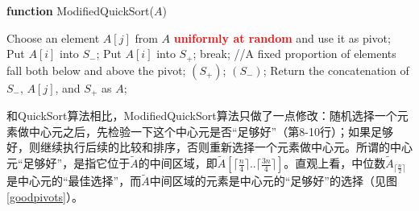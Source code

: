 \begin{algorithm}[H]
\caption{{\sc ModifiedQuickSort} algorithm}\label{ModifiedQuickSortAlgo} 
{\bf function} {\sc ModifiedQuickSort}($A$) 
\begin{algorithmic}[1]
	\STATE Choose an element $A[j]$ from $A$ \textcolor{red}{\bf uniformly at random} and use it as pivot;
			\STATE Put $A[i]$ into $S_{-}$;
		\ELSE 
			\STATE Put $A[i]$ into $S_{+}$; 
		\ENDIF
	\ENDFOR	
		\STATE break; //A fixed proportion of elements fall both below and above the pivot; 
	\ENDIF
\ENDWHILE
{}$(S_{+})$;
$(S_{-})$;
\STATE Return the concatenation of $S_{-}$, $A[j]$, and $S_{+}$ as $A$; 
\end{algorithmic}
\end{algorithm}

和{\sc QuickSort}算法相比，{\sc ModifiedQuickSort}算法只做了一点修改：随机选择一个元素做中心元之后，先检验一下这个中心元是否“足够好”（第8-10行）；如果足够好，则继续执行后续的比较和排序，否则重新选择一个元素做中心元。所谓的中心元“足够好”，是指它位于$\tilde{A}$的中间区域，即$\tilde{A}[\lceil\frac{n}{4}\rceil..\lceil\frac{3n}{4}\rceil]$。直观上看，中位数$\tilde{A}_{\lceil\frac{n}{2}\rceil}$是中心元的“最佳选择”，而$\tilde{A}$中间区域的元素是中心元的“足够好”的选择（见图\ref{goodpivots}）。

